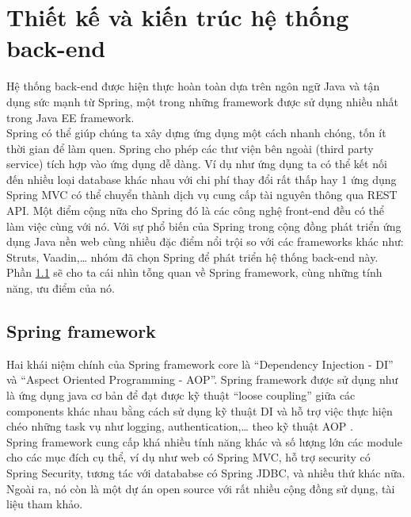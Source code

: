 \documentclass[12pt,a4paper,oneside]{extbook}
\begin{document}
\section{Thiết kế và kiến trúc hệ thống back-end}

Hệ thống back-end được hiện thực hoàn toàn dựa trên ngôn ngữ Java và tận dụng sức mạnh từ Spring, một trong những framework được sử dụng nhiều nhất trong Java EE framework.\\

\noindent
Spring có thể giúp chúng ta xây dựng ứng dụng một cách nhanh chóng, tốn ít thời gian để làm quen. Spring cho phép các thư viện bên ngoài (third party service) tích hợp vào ứng dụng dễ dàng. Ví dụ như ứng dụng ta có thể kết nối đến nhiều loại database khác nhau với chi phí thay đổi rất thấp hay 1 ứng dụng Spring MVC có thể chuyển thành dịch vụ cung cấp tài nguyên thông qua REST API. Một điểm cộng nữa cho Spring đó là các công nghệ front-end đều có thể làm việc cùng với nó. Với sự phổ biến của Spring trong cộng đồng phát triển ứng dụng Java nền web cùng nhiều đặc điểm nổi trội so với các frameworks khác như: Struts, Vaadin,\dots\hspace{0mm} nhóm đã chọn Spring để phát triển hệ thống back-end này. Phần \ref{spring} sẽ cho ta cái nhìn tỗng quan về Spring framework, cùng những tính năng, ưu điểm của nó.

\subsection{Spring framework}\label{spring}

Hai khái niệm chính của Spring framework core là “Dependency Injection - DI” và “Aspect Oriented Programming - AOP”. Spring framework được sử dụng như là ứng dụng java cơ bản để đạt được kỹ thuật “loose coupling” giữa các components khác nhau bằng cách sử dụng kỹ thuật DI và hỗ trợ việc thực hiện chéo những task vụ như logging, authentication,\dots\hspace{0mm} theo kỹ thuật AOP \cite{spring-questions}\cite{spring-home-page}.\\

\noindent
Spring framework cung cấp khá nhiều tính năng khác và số lượng lớn các module cho các mục đích cụ thể, ví dụ như web có Spring MVC, hỗ trợ security có Spring Security, tương tác với datababse có Spring JDBC, và nhiều thứ khác nữa. Ngoài ra, nó còn là một dự án open source với rất nhiều cộng đồng sử dụng, tài liệu tham khảo.
\end{document}
